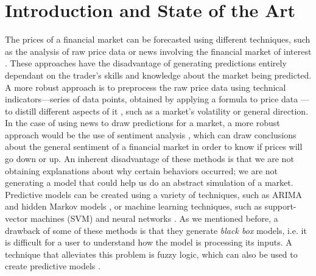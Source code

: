 ﻿\documentclass{ieeeaccess}
\begin{document}
\maketitle

\section{Introduction and State of the Art} %
\label{section:introduction}

The prices of a financial market can be forecasted using different
techniques, such as the analysis of raw price data or news involving
the financial market of interest \cite{Liu2019}. These approaches have
the disadvantage of generating predictions
entirely dependant on the trader's skills and knowledge about the
market being predicted.
A more robust approach is to preprocess the raw price data using
technical indicators---series of data points, obtained by applying a
formula to price data \cite{fernandez2008technical}---to distill
different aspects of it \cite{Alsubaie2019}, such as a market's
volatility or general direction. In the case of using news to draw
predictions for a market, a more robust approach would be the use of
sentiment analysis \cite{LienMinh2018}
\cite{Cabrera2018}, which can draw conclusions about the general
sentiment of a financial market in order to know if prices will go
down or up. An inherent disadvantage of these methods is that we are not 
obtaining explanations about why certain behaviors occurred; we
are not generating a model that could help us do an abstract
simulation of a market. Predictive models can be created using a variety of
techniques, such as ARIMA \cite{Idrees2019} and hidden Markov models
\cite{Cao2019}, or machine learning techniques, such as support-vector
machines (SVM) \cite{Guo2018} and neural networks \cite{Chen2019a}. As
we mentioned before, a drawback of some of these methods is that they generate \textit{black
box} models, i.e. it is difficult for a user to understand how the
model is processing its inputs. A technique that alleviates this
problem is fuzzy logic, which can also be used to create predictive
models \cite{Jiang2018} \cite{Sang2019} \cite{Chourmouziadis2019}.
\end{document}
